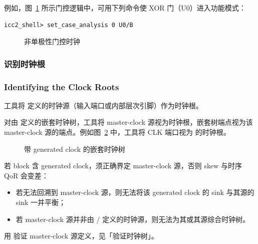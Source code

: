 例如，图~\ref{fig:cts-non-unate} 所示门控逻辑中，可用下列命令使 XOR 门（U0）进入功能模式：
\begin{lstlisting}
icc2_shell> set_case_analysis 0 U0/B
\end{lstlisting}

\begin{figure}[htbp]
\centering
{}
\caption{非单极性门控时钟}
\label{fig:cts-non-unate}
\end{figure}

\subsubsection{识别时钟根}
\subsubsection*{Identifying the Clock Roots}

工具将  定义的时钟源（输入端口或内部层次引脚）作为时钟根。

对由  定义的嵌套时钟树，工具将 master-clock 源视为时钟根，嵌套树端点视为该 master-clock 源的端点。例如图~\ref{fig:cts-nested} 中，工具将 CLK 端口视为  的时钟根。

\begin{figure}[htbp]
\centering
{}
\caption{带 generated clock 的嵌套时钟树}
\label{fig:cts-nested}
\end{figure}

若 block 含 generated clock，须正确界定 master-clock 源，否则 skew 与时序 QoR 会变差：
\begin{itemize}
  \item 若无法回溯到 master-clock 源，则无法将该 generated clock 的 sink 与其源的 sink 一并平衡；
  \item 若 master-clock 源并非由 / 定义的时钟源，则无法为其或其源综合时钟树。
\end{itemize}
用  验证 master-clock 源定义，见「验证时钟树」。

